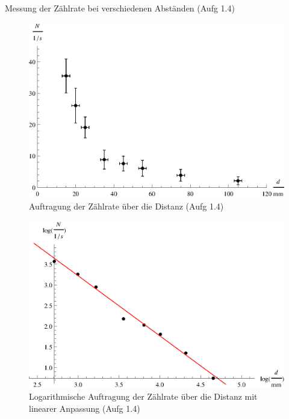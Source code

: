 \begin{table}[tb]
	\centering
	\caption{Messung der Zählrate bei verschiedenen Abständen (Aufg 1.4)}
	\label{tab:ii_1p4}
	
\end{table}

\begin{figure}[tb]
	\centering
	\includegraphics[scale=0.9]{fig/ii_1p4_error.eps}
	\caption{Auftragung der Zählrate über die Distanz (Aufg 1.4)}
	\label{fig:ii_1p4_error}
\end{figure}

\begin{figure}[tb]
	\centering
	\includegraphics[scale=1.0]{fig/ii_1p4_log.eps}
	\caption{Logarithmische Auftragung der Zählrate über die Distanz mit linearer Anpassung (Aufg 1.4)}
	\label{fig:ii_1p4_log}
\end{figure}

